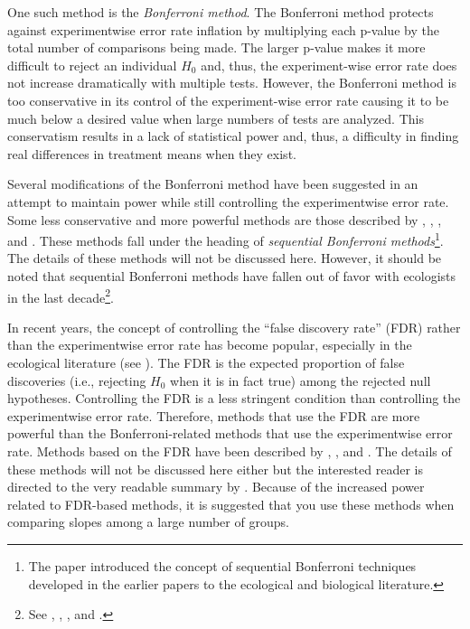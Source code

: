 \documentclass[10pt,openany]{book}\usepackage[]{graphicx}\usepackage[]{color}
\begin{document}
One such method is the \emph{Bonferroni method}.  The Bonferroni method protects against experimentwise error rate inflation by multiplying each p-value by the total number of comparisons being made.  The larger p-value makes it more difficult to reject an individual $H_{0}$ and, thus, the experiment-wise error rate does not increase dramatically with multiple tests.  However, the Bonferroni method is too conservative in its control of the experiment-wise error rate causing it to be much below a desired value when large numbers of tests are analyzed.  This conservatism results in a lack of statistical power and, thus, a difficulty in finding real differences in treatment means when they exist.


Several modifications of the Bonferroni method have been suggested in an attempt to maintain power while still controlling the experimentwise error rate.  Some less conservative and more powerful methods are those described by \cite{Holm1979}, \cite{Hochberg1988}, \cite{Hommel1988}, and \cite{Rice1989}.  These methods fall under the heading of \emph{sequential Bonferroni methods}\footnote{The \cite{Rice1989} paper introduced the concept of sequential Bonferroni techniques developed in the earlier papers to the ecological and biological literature.}.  The details of these methods will not be discussed here.  However, it should be noted that sequential Bonferroni methods have fallen out of favor with ecologists in the last decade\footnote{See \cite{Perneger1998}, \cite{Moran2003}, \cite{Garcia2004}, and \cite{RobackAskins2005}.}.


In recent years, the concept of controlling the ``false discovery rate'' (FDR) rather than the experimentwise error rate has become popular, especially in the ecological literature (see \cite{Verhoevenetal2005}).  The FDR is the expected proportion of false discoveries (i.e., rejecting $H_{0}$ when it is in fact true) among the rejected null hypotheses.  Controlling the FDR is a less stringent condition than controlling the experimentwise error rate.  Therefore, methods that use the FDR are more powerful than the Bonferroni-related methods that use the experimentwise error rate.  Methods based on the FDR have been described by \cite{BenjaminiHochberg1995}, \cite{BenjaminiYekutieli2001}, and \cite{Storey2002}.  The details of these methods will not be discussed here either but the interested reader is directed to the very readable summary by \cite{Verhoevenetal2005}.  Because of the increased power related to FDR-based methods, it is suggested that you use these methods when comparing slopes among a large number of groups.
\end{document}
